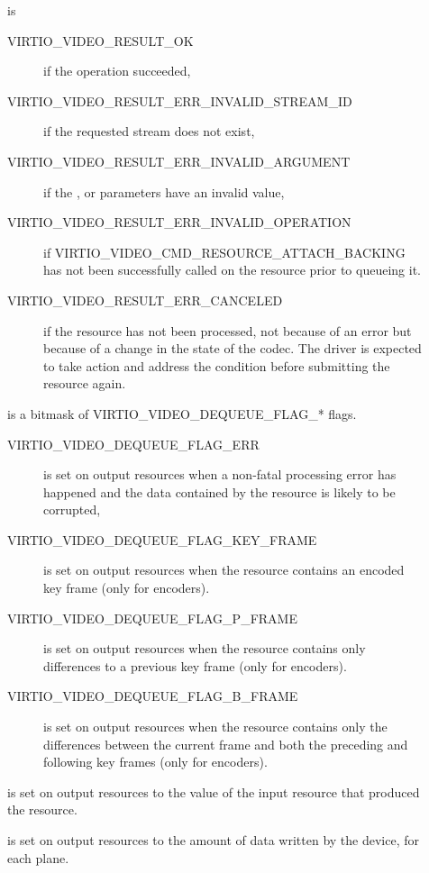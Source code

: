 \begin{description}
\item[]
is

\begin{description}
\item[VIRTIO\_VIDEO\_RESULT\_OK]
if the operation succeeded,
\item[VIRTIO\_VIDEO\_RESULT\_ERR\_INVALID\_STREAM\_ID]
if the requested stream does not exist,
\item[VIRTIO\_VIDEO\_RESULT\_ERR\_INVALID\_ARGUMENT]
if the ,  or 
parameters have an invalid value,
\item[VIRTIO\_VIDEO\_RESULT\_ERR\_INVALID\_OPERATION]
if VIRTIO\_VIDEO\_CMD\_RESOURCE\_ATTACH\_BACKING has not been
successfully called on the resource prior to queueing it.
\item[VIRTIO\_VIDEO\_RESULT\_ERR\_CANCELED]
if the resource has not been processed, not because of an error but
because of a change in the state of the codec. The driver is expected to
take action and address the condition before submitting the resource
again.
\end{description}
\item[]
is a bitmask of VIRTIO\_VIDEO\_DEQUEUE\_FLAG\_* flags.

\begin{description}
\item[VIRTIO\_VIDEO\_DEQUEUE\_FLAG\_ERR]
is set on output resources when a non-fatal processing error has
happened and the data contained by the resource is likely to be
corrupted,
\item[VIRTIO\_VIDEO\_DEQUEUE\_FLAG\_KEY\_FRAME]
is set on output resources when the resource contains an encoded key
frame (only for encoders).
\item[VIRTIO\_VIDEO\_DEQUEUE\_FLAG\_P\_FRAME]
is set on output resources when the resource contains only differences
to a previous key frame (only for encoders).
\item[VIRTIO\_VIDEO\_DEQUEUE\_FLAG\_B\_FRAME]
is set on output resources when the resource contains only the
differences between the current frame and both the preceding and
following key frames (only for encoders).
\end{description}
\item[]
is set on output resources to the  value of the input
resource that produced the resource.
\item[]
is set on output resources to the amount of data written by the device,
for each plane.
\end{description}

